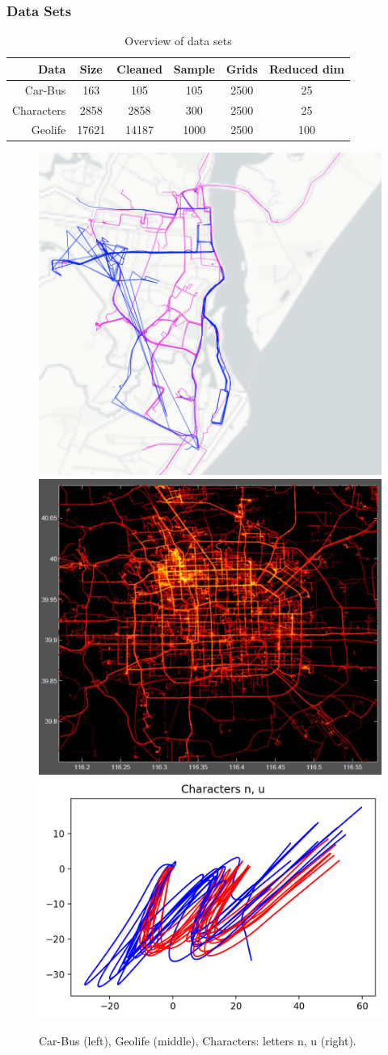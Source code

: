 \documentclass{beamer}
\begin{document}
\begin{frame}
\frametitle{Data Sets} 
\begin{block}{} \vspace{-8mm}
\begin{table}[!htbp]
{\footnotesize
\centering
\begin{tabular}{rccccc}
 	{\bf Data } 	&  	{\bf Size}  	& 	{\bf Cleaned}  	& {\bf Sample}	& {\bf Grids}	&	{\bf Reduced dim}	\\ \midrule
 	Car-Bus   		& 	163   	& 	105 			&	105		&	2500		&	25	\\ \midrule
	Characters   	& 	2858	    	& 	2858 		&	300		&	2500		&	25	\\ \midrule
 	Geolife  		&   	17621  	&      14187		&	1000		&	2500		&	100	\\ \bottomrule 
\end{tabular} 
\caption{\footnotesize Overview of data sets}
\label{table: datasets} 
}
\end{table} \vspace{-6mm} \pause

\begin{figure}[h] 
\includegraphics[width=0.28 \textwidth]{car-bus} 
\includegraphics[width=0.3 \textwidth]{Geolife}
\includegraphics[width=0.35 \textwidth]{Characters-2-fig}
\caption{Car-Bus (left), Geolife (middle), Characters: letters n, u (right).}
\label{characters}
\end{figure}
\end{block}
\end{frame}
\end{document}
